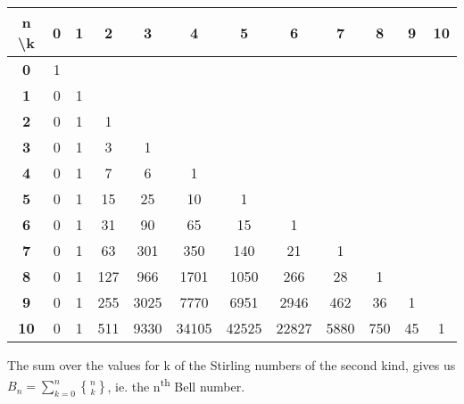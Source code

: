 \begin{center}
    \begin{tabular}{|c|c|c|c|c|c|c|c|c|c|c|c|}
        \hline
        \textbf{n \textbackslash \text{ }k} & \textbf{0} & \textbf{1} & \textbf{2} & \textbf{3} & \textbf{4} & \textbf{5} & \textbf{6} & \textbf{7} & \textbf{8} & \textbf{9} & \textbf{10} \\
        \hline
        \textbf{0} & 1 & & & & & & & & & & \\
        \hline
        \textbf{1} & 0 & 1 & & & & & & & & & \\
        \hline
        \textbf{2} & 0 & 1 & 1 & & & & & & & & \\
        \hline
        \textbf{3} & 0 & 1 & 3 & 1 & & & & & & & \\
        \hline
        \textbf{4} & 0 & 1 & 7 & 6 & 1 & & & & & & \\
        \hline
        \textbf{5} & 0 & 1 & 15 & 25 & 10 & 1 & & & & & \\
        \hline
        \textbf{6} & 0 & 1 & 31 & 90 & 65 & 15 & 1 & & & & \\
        \hline
        \textbf{7} & 0 & 1 & 63 & 301 & 350 & 140 & 21 & 1 & & & \\
        \hline
        \textbf{8} & 0 & 1 & 127 & 966 & 1701 & 1050 & 266 & 28 & 1 & & \\
        \hline
        \textbf{9} & 0 & 1 & 255 & 3025 & 7770 & 6951 & 2946 & 462 & 36 & 1 & \\
        \hline
        \textbf{10} & 0 & 1 & 511 & 9330 & 34105 & 42525 & 22827 & 5880 & 750 & 45 & 1 \\
        \hline
    \end{tabular}
\end{center}

The sum over the values for k of the Stirling numbers of the second kind, gives us $\displaystyle B_n = \sum_{k=0}^n \genfrac{\{}{\}}{0pt}{}{n}{k}$, ie. the n\textsuperscript{th} Bell number.


\newpage